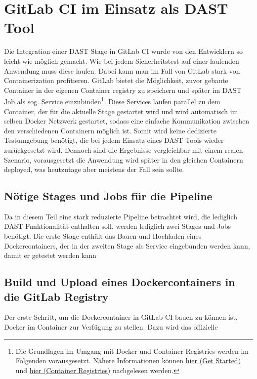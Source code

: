 \section{GitLab CI im Einsatz als DAST Tool}\label{sec:gitlab-ci-im-einsatz-als-dast-tool}

Die Integration einer DAST Stage in GitLab CI wurde von den Entwicklern so leicht wie möglich gemacht.
Wie bei jedem Sicherheitstest auf einer laufenden Anwendung muss diese laufen.
Dabei kann man im Fall von GitLab stark von Containerization profitieren.
GitLab bietet die Möglichkeit, zuvor gebaute Container in der eigenen Container registry zu speichern und später im DAST Job als sog. Service einzubinden\footnote{Die Grundlagen im Umgang mit Docker und Container Registries werden im Folgenden vorausgesetzt. Nähere Informationen können \href{https://docs.docker.com/get-started/}{hier (Get Started)} und \href{https://docs.docker.com/registry/}{hier (Container Registries)} nachgelesen werden.}.
Diese Services laufen parallel zu dem Container, der für die aktuelle Stage gestartet wird und wird automatisch im selben Docker Netzwerk gestartet, sodass eine einfache Kommunikation zwischen den verschiedenen Containern möglich ist.
Somit wird keine dedizierte Testumgebung benötigt, die bei jedem Einsatz eines DAST Tools wieder zurückgesetzt wird.
Dennoch sind die Ergebnisse vergleichbar mit einem realen Szenario, vorausgesetzt die Anwendung wird später in den gleichen Containern deployed, was heutzutage aber meistens der Fall sein sollte.

\subsection{Nötige Stages und Jobs für die Pipeline}

Da in diesem Teil eine stark reduzierte Pipeline betrachtet wird, die lediglich DAST Funktionalität enthalten soll, werden lediglich zwei Stages und Jobs benötigt.
Die erste Stage enthält das Bauen und Hochladen eines Dockercontainers, der in der zweiten Stage als Service eingebunden werden kann, damit er getestet werden kann

\subsection{Build und Upload eines Dockercontainers in die GitLab Registry}

Der erste Schritt, um die Dockercontainer in GitLab CI bauen zu können ist, Docker im Container zur Verfügung zu stellen.
Dazu wird das offizielle %

